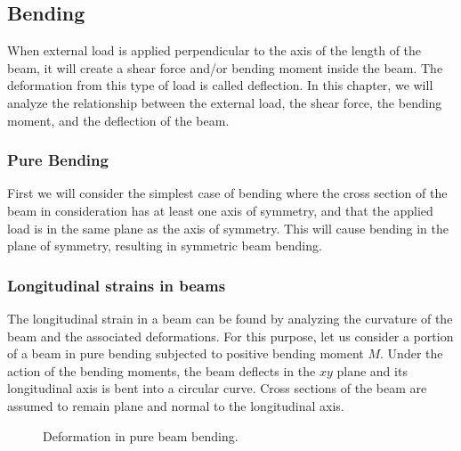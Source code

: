 \documentclass[a4paper,openany,nobib]{tufte-book}
\begin{document}
\subsection{Bending}
\label{section: bending}
When external load is applied perpendicular to the axis of the length of
the beam, it will create a shear force and/or bending moment inside the
beam. The deformation from this type of load is called deflection. In
this chapter, we will analyze the relationship between the external
load, the shear force, the bending moment, and the deflection of the
beam.

\subsubsection{Pure Bending}
\label{pure-bending}
First we will consider the simplest case of bending where the cross
section of the beam in consideration has at least one axis of symmetry,
and that the applied load is in the same plane as the axis of symmetry.
This will cause bending in the plane of symmetry, resulting in symmetric
beam bending.

\subsubsection{Longitudinal strains in beams}
\label{longitudinal-strains-in-beams}
The longitudinal strain in a beam can be found by analyzing the
curvature of the beam and the associated deformations. For this purpose,
let us consider a portion of a beam in pure bending subjected to
positive bending moment \(M\). Under the action of the bending moments,
the beam deflects in the \(xy\) plane and its longitudinal axis is bent
into a circular curve. Cross sections of the beam are assumed to remain
plane and normal to the longitudinal axis.

\begin{figure}[h]
  \centering
  \caption{Deformation in pure beam bending.}
\end{figure}
\end{document}
